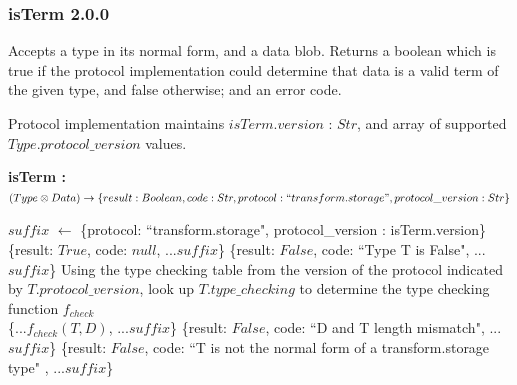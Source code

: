 \documentclass[9pt, oneside]{article}   	%
\begin{document}
\subsubsection{isTerm 2.0.0}\label{isTerm_code}

Accepts a type in its normal form, and a data blob. Returns a boolean which is true if the protocol implementation could determine that data is a valid term of the given type, and false otherwise; and an error code.

Protocol implementation maintains $isTerm.version$ : $Str$, and array of supported $Type.protocol\_version$ values.

\vspace{.25 cm}
\begin{algorithm}[H]
\setcounter{AlgoLine}{0}
\caption{\textbf{isTerm : \\ $(Type \otimes Data) \rightarrow \{result: Boolean, code: Str, protocol: ``transform.storage", protocol\_version : Str\}$}}
\label{algo_isTerm}
\label{alg:quad}
\SetAlgoLined
$suffix$ $\leftarrow$ \{protocol: ``transform.storage", protocol\_version : isTerm.version\} \\
 {
	\Return \{result: $True$, code: $null$, ...$suffix$\}
	}
{
	\Return \{result: $False$, code: ``Type T is False", ...$suffix$\}
}
	{
		Using the type checking table from the version of the protocol indicated by $T.protocol\_version$, look up $T.type\_checking$ to determine the type checking function $f_{check}$\\
    		\Return \{...$f_{check}(T, D)$, ...$suffix$\}
	}
{
	{
		\Return \{result: $False$, code: ``D and T length mismatch", ...$suffix$\}
	}
    }
\Else
{
	\Return \{result: $False$, code: ``T is not the normal form of a transform.storage type" , ...$suffix$\}\
}
\end{algorithm}
\end{document}
